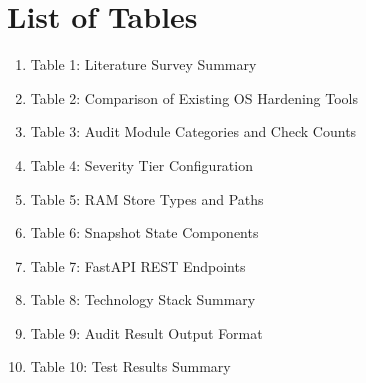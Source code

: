 \documentclass[12pt,oneside,a4paper]{article}
\begin{document}
\pagebreak
\section*{List of Tables}
\begin{enumerate}
    \item Table 1: Literature Survey Summary
    \item Table 2: Comparison of Existing OS Hardening Tools
    \item Table 3: Audit Module Categories and Check Counts
    \item Table 4: Severity Tier Configuration
    \item Table 5: RAM Store Types and Paths
    \item Table 6: Snapshot State Components
    \item Table 7: FastAPI REST Endpoints
    \item Table 8: Technology Stack Summary
    \item Table 9: Audit Result Output Format
    \item Table 10: Test Results Summary
\end{enumerate}

\pagebreak
\tableofcontents


\end{document}
